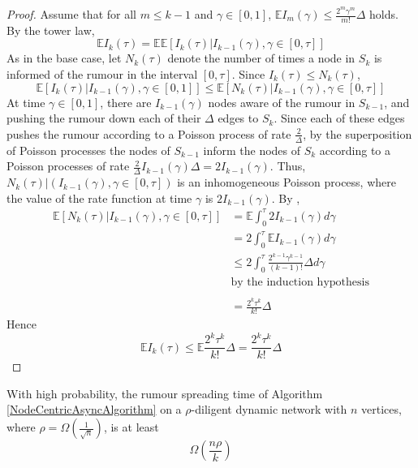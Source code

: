 \begin{proof}
	Assume that for all $m \leq k - 1$ and $\gamma \in [0,1]$, $\mathbb{E}I_m(\gamma) \leq \frac{2^m \gamma^m}{m!}\Delta$ holds.
	By the tower law,
	$$
		\mathbb{E}I_k(\tau) = \mathbb{E}\mathbb{E}[I_k(\tau) |I_{k-1}(\gamma), \gamma \in [0, \tau]] %
	$$
	As in the base case, let $N_k(\tau)$ denote the number of times a node in $S_k$ is informed of the rumour in the interval $[0, \tau]$. Since $I_k(\tau) \leq N_k(\tau)$,
	$$
		\mathbb{E}[I_k(\tau) |I_{k-1}(\gamma), \gamma \in [0, 1]] \leq \mathbb{E}[N_k(\tau) |I_{k-1}(\gamma), \gamma \in [0, \tau]]
	$$
	At time $\gamma \in [0,1]$, there are $I_{k-1}(\gamma)$ nodes aware of the rumour in $S_{k-1}$, and pushing the rumour down each of their $\Delta$ edges to $S_k$. Since each of these edges pushes the rumour according to a Poisson process of rate $\frac{2}{\Delta}$, by the superposition of Poisson processes the nodes of $S_{k-1}$ inform the nodes of $S_k$ according to a Poisson processes of rate $\frac{2}{\Delta}I_{k-1}(\gamma)\Delta = 2 I_{k-1}(\gamma)$.
	Thus, $N_k(\tau)|(I_{k-1}(\gamma), \gamma \in [0, \tau])$ is an inhomogeneous Poisson process, where the value of the rate function at time $\gamma$ is $2 I_{k-1}(\gamma)$. By %
	, 
	\begin{align*}
		\mathbb{E}[N_k(\tau)|I_{k-1}(\gamma), \gamma \in [0, \tau]] &= \mathbb{E}\int_0^\tau 2 I_{k-1}(\gamma) d\gamma \\
		&= 2 \int_0^\tau \mathbb{E}I_{k-1}(\gamma) d\gamma \\ %
		& \leq 2 \int_0^\tau \frac{2^{k-1} \gamma^{k-1}}{(k-1)!} \Delta d\gamma \\
		& \text{by the induction hypothesis}\\
		\\
		& = \frac{2^k \tau^k}{k!} \Delta
	\end{align*}
	Hence 
	$$
		\mathbb{E}I_k(\tau) \leq \mathbb{E}\frac{2^k \tau^k}{k!}\Delta = \frac{2^k \tau^k}{k!}\Delta
	$$

\end{proof}


\begin{theorem}
	With high probability, the rumour spreading time of Algorithm \ref{NodeCentricAsyncAlgorithm} on a $\rho$-diligent dynamic network with $n$ vertices, where $\rho = \Omega(\frac{1}{\sqrt{n}})$, is at least 
	$$
		\Omega\left(\frac{n \rho}{k}\right)
	$$
\end{theorem}

